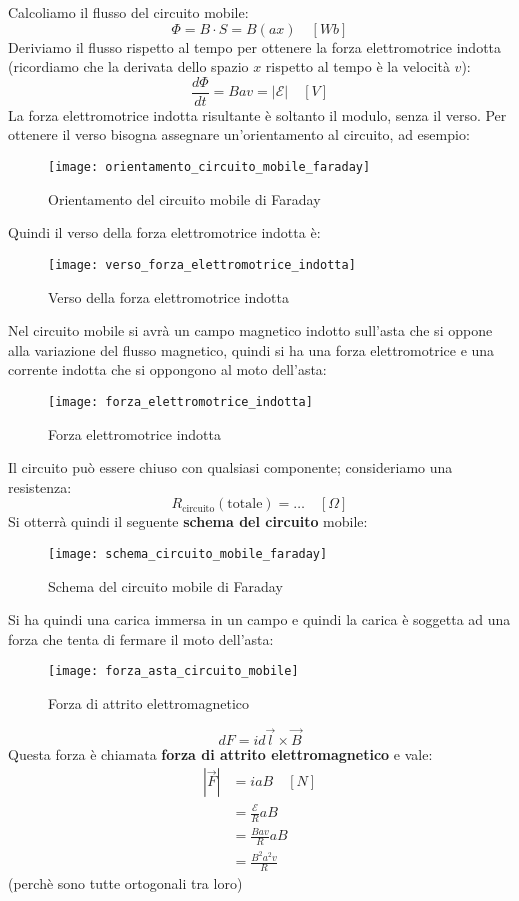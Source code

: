\documentclass[a4paper]{article}
\begin{document}
\vspace{1em}
\noindent
Calcoliamo il flusso del circuito mobile:
\[
  \Phi = B \cdot S = B (ax) \quad \left[ Wb \right]
\] 
Deriviamo il flusso rispetto al tempo per ottenere la forza elettromotrice indotta
(ricordiamo che la derivata dello spazio \( x \) rispetto al tempo è la velocità \( v \)):
\[
  \frac{d \Phi }{dt} = B a v = |\mathcal{E}| \quad \left[ V \right]
\] 
La forza elettromotrice indotta risultante è soltanto il modulo, senza il verso. Per
ottenere il verso bisogna assegnare un'orientamento al circuito, ad esempio:
\begin{figure}[H]
  \centering
  \texttt{[image: orientamento\_circuito\_mobile\_faraday]}
  \caption{Orientamento del circuito mobile di Faraday}
\end{figure}
\noindent
Quindi il verso della forza elettromotrice indotta è:
\begin{figure}[H]
  \centering
  \texttt{[image: verso\_forza\_elettromotrice\_indotta]}
  \caption{Verso della forza elettromotrice indotta}
\end{figure}
\noindent
Nel circuito mobile si avrà un campo magnetico indotto sull'asta che si oppone
alla variazione del flusso magnetico, quindi si ha una forza elettromotrice e una
corrente indotta che si oppongono al moto dell'asta:
\begin{figure}[H]
  \centering
  \texttt{[image: forza\_elettromotrice\_indotta]}
  \caption{Forza elettromotrice indotta}
\end{figure}
\noindent
Il circuito può essere chiuso con qualsiasi componente; consideriamo una resistenza:
\[
  R_{\text{circuito}}(\text{totale}) = \ldots \quad \left[ \Omega \right]
\] 
Si otterrà quindi il seguente \textbf{schema del circuito} mobile:
\begin{figure}[H]
  \centering
  \texttt{[image: schema\_circuito\_mobile\_faraday]}
  \caption{Schema del circuito mobile di Faraday}
\end{figure}
\noindent
Si ha quindi una carica immersa in un campo e quindi la carica è soggetta ad una forza
che tenta di fermare il moto dell'asta:
\begin{figure}[H]
  \centering
  \texttt{[image: forza\_asta\_circuito\_mobile]}
  \caption{Forza di attrito elettromagnetico}
\end{figure}
\[
  dF = i d\vec{l} \times \vec{B}
\]
Questa forza è chiamata \textbf{forza di attrito elettromagnetico} e vale:
\[
  \begin{aligned}
    |\vec{F}| &= ia B \quad \left[ N \right]\\
              &= \frac{\mathcal{E}}{R} aB \\
              &= \frac{Bav}{R} aB\\
              &= \frac{B^2 a^2 v}{R}
  \end{aligned}
\] 
(perchè sono tutte ortogonali tra loro)
\end{document}
